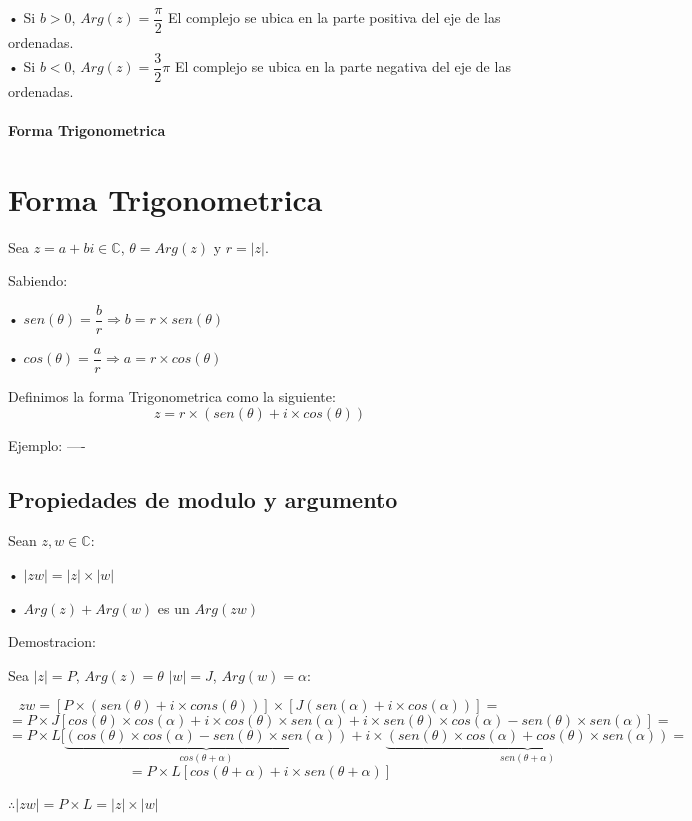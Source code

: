\qquad\qquad • Si $b>0$, $Arg(z)=\dfrac{\pi}{2}$ El complejo se ubica en la parte positiva del eje de las ordenadas.\\

\qquad\qquad • Si $b<0$, $Arg(z)=\dfrac{3}{2}\pi$ El complejo se ubica en la parte negativa del eje de las ordenadas.

\paragraph{Forma Trigonometrica}
\section{Forma Trigonometrica}

Sea $z=a+bi \in \mathbb{C}$, $\theta=Arg(z)$ y $r=|z|$. 

Sabiendo:

\quad • $sen(\theta)=\dfrac{b}{r} \Rightarrow b=r\times sen(\theta)$

\quad • $cos(\theta)=\dfrac{a}{r} \Rightarrow a=r\times cos(\theta)$
				
Definimos la forma Trigonometrica como la siguiente:
$$z= r\times(sen(\theta)+i \times cos(\theta))$$


Ejemplo:
----

\subsection{Propiedades de modulo y argumento}

Sean $z,w \in \mathbb{C}$:

\quad • $|zw|=|z|\times|w|$

\quad • $Arg(z)+Arg(w)$ es un $Arg(zw)$


Demostracion:

\quad Sea $|z|=P$, $Arg(z)=\theta$ \quad $|w|=J$, $Arg(w)=\alpha$:

$$zw=[P\times (sen(\theta)+i \times cons(\theta))]\times [J(sen(\alpha)+i\times cos(\alpha))]=$$
$$=P\times J [cos(\theta)\times cos(\alpha)+i\times cos(\theta)\times sen(\alpha)+i\times sen(\theta)\times cos(\alpha)-sen(\theta)\times sen(\alpha)]=$$
$$=P \times L [\underbrace{(cos(\theta)\times cos(\alpha)- sen(\theta)\times sen(\alpha))} _{cos(\theta+\alpha)}+ i \times \underbrace{(sen(\theta)\times cos(\alpha)+cos(\theta)\times sen(\alpha))} _{sen(\theta +\alpha)}=$$
$$=P \times L [cos(\theta + \alpha)+ i \times sen(\theta + \alpha)]$$

$\therefore |zw|=P \times L=|z| \times |w|$\\

